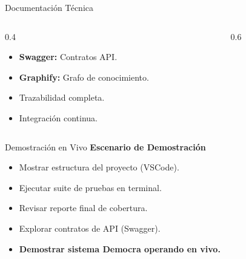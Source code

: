 \documentclass[aspectratio=169]{beamer}
\begin{document}
\begin{frame}{Documentación Técnica}
    \begin{columns}[T]
        \begin{column}{0.4\textwidth}
            \vspace{1cm}
            \begin{itemize}
                \item \textbf{Swagger:} Contratos API.
                \item \textbf{Graphify:} Grafo de conocimiento.
                \item Trazabilidad completa.
                \item Integración continua.
            \end{itemize}
        \end{column}
        \begin{column}{0.6\textwidth}
            \centering
        \end{column}
    \end{columns}
\end{frame}

\begin{frame}{Demostración en Vivo}
    \centering
    \vspace{0.5cm}
    \Large \textcolor{AzulOscuro}{\textbf{Escenario de Demostración}}
    \normalsize
    \vspace{0.8cm}
    \begin{itemize}
        \item Mostrar estructura del proyecto (VSCode).
        \item Ejecutar suite de pruebas en terminal.
        \item Revisar reporte final de cobertura.
        \item Explorar contratos de API (Swagger).
        \item \textbf{Demostrar sistema Democra operando en vivo.}
    \end{itemize}
\end{frame}
\end{document}

